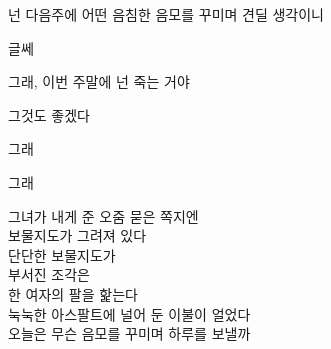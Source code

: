 \begin{description}

\tightlist

\item[그녀가 꺼낸 편지엔 내 유언이 적혀 있었다.]

넌 다음주에 어떤 음침한 음모를 꾸미며 견딜 생각이니



글쎄



그래, 이번 주말에 넌 죽는 거야



그것도 좋겠다



그래



그래

\end{description}



그녀가 내게 준 오줌 묻은 쪽지엔\\

보물지도가 그려져 있다\\

단단한 보물지도가\\

부서진 조각은\\

한 여자의 팔을 핥는다\\

눅눅한 아스팔트에 널어 둔 이불이 얼었다\\

오늘은 무슨 음모를 꾸미며 하루를 보낼까

